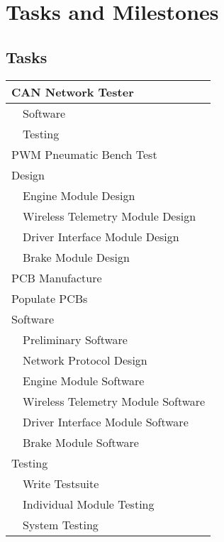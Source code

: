 %
%
%
%

\chapter{Tasks and Milestones}

\section{Tasks}

\begin{center}
  \begin{tabular}{|l|l|}
  \hline 
  \multicolumn{2}{|l|}{CAN Network Tester}\\
  \hline 
  & Software\\
  \hline 
  & Testing\\
  \hline 
  \multicolumn{2}{|l|}{PWM Pneumatic Bench Test}\\
  \hline 
  \multicolumn{2}{|l|}{Design}\\
  \hline 
  & Engine Module Design\\
  \hline 
  & Wireless Telemetry Module Design\\
  \hline 
  & Driver Interface Module Design\\
  \hline 
  & Brake Module Design\\
  \hline 
  \multicolumn{2}{|l|}{PCB Manufacture}\\
  \hline 
  \multicolumn{2}{|l|}{Populate PCBs}\\
  \hline 
  \multicolumn{2}{|l|}{Software}\\
  \hline 
  & Preliminary Software\\
  \hline 
  & Network Protocol Design\\
  \hline 
  & Engine Module Software\\
  \hline 
  & Wireless Telemetry Module Software\\
  \hline 
  & Driver Interface Module Software\\
  \hline 
  & Brake Module Software\\
  \hline 
  \multicolumn{2}{|l|}{Testing}\\
  \hline 
  & Write Testsuite\\
  \hline 
  & Individual Module Testing\\
  \hline 
  & System Testing\\
  \hline
  \end{tabular}
\end{center}

